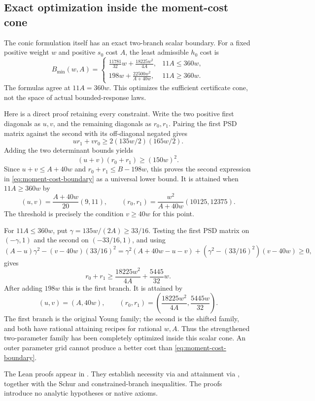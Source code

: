 \subsection{Exact optimization inside the moment-cost cone}
\label{sec:moment-cost-boundary}
The conic formulation itself has an exact two-branch scalar boundary. For a
fixed positive weight $w$ and positive $s_0$ cost $A$, the least admissible
$h_0$ cost is
\begin{equation}\label{eq:moment-cost-boundary}
 B_{\min}(w,A)=
 \begin{cases}
 \displaystyle\frac{11781}{32}w+\frac{18225w^2}{4A},&11A\le360w,\\[5pt]
 \displaystyle198w+\frac{22500w^2}{A+40w},&11A\ge360w.
 \end{cases}
\end{equation}
The formulas agree at $11A=360w$. This optimizes the sufficient certificate
cone, not the space of actual bounded-response laws.

Here is a direct proof retaining every constraint. Write the two positive
first diagonals as $u,v$, and the remaining diagonals as $r_0,r_1$.
Pairing the first PSD matrix against the second with its off-diagonal
negated gives
\[
 ur_1+vr_0\ge2(135w/2)(165w/2).
\]
Adding the two determinant bounds yields
\[
 (u+v)(r_0+r_1)\ge(150w)^2.
\]
Since $u+v\le A+40w$ and $r_0+r_1\le B-198w$, this proves the second
expression in \eqref{eq:moment-cost-boundary} as a universal lower bound.
It is attained when $11A\ge360w$ by
\[
 (u,v)=\frac{A+40w}{20}(9,11),\qquad
 (r_0,r_1)=\frac{w^2}{A+40w}(10125,12375).
\]
The threshold is precisely the condition $v\ge40w$ for this point.

For $11A\le360w$, put $\gamma=135w/(2A)\ge33/16$.
Testing the first PSD matrix on $(-\gamma,1)$ and the second on
$(-33/16,1)$, and using
\[
 (A-u)\gamma^2-(v-40w)(33/16)^2
 =\gamma^2(A+40w-u-v)
 +(\gamma^2-(33/16)^2)(v-40w)\ge0,
\]
gives
\[
 r_0+r_1\ge\frac{18225w^2}{4A}+\frac{5445}{32}w.
\]
After adding $198w$ this is the first branch. It is attained by
\[
 (u,v)=(A,40w),\qquad
 (r_0,r_1)=\left(\frac{18225w^2}{4A},\frac{5445w}{32}\right).
\]
The first branch is the original Young family; the second is the shifted
family, and both have rational attaining recipes for rational $w,A$.
Thus the strengthened two-parameter family has been completely optimized
inside this scalar cone. An outer parameter grid cannot produce a better
cost than \eqref{eq:moment-cost-boundary}.

The Lean proofs appear in
.
They establish necessity via  and attainment
via , together with the Schur and constrained-branch
inequalities. The proofs introduce no analytic hypotheses or native axioms.

